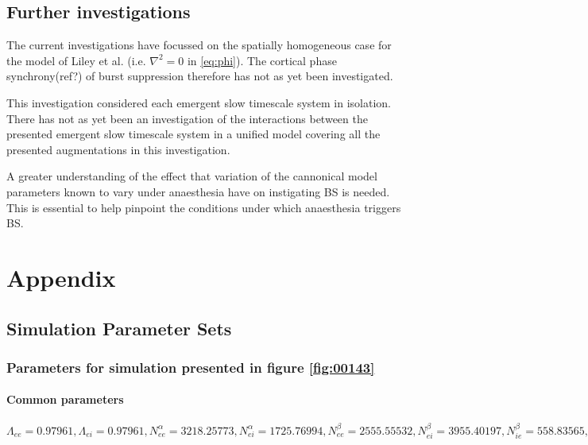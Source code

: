 \documentclass[a4paper,12pt]{article}
\begin{document}
\subsection{Further investigations}
The current investigations have focussed on the spatially homogeneous case for the model of Liley et al. (i.e. $\nabla^2 =
0$ in \ref{eq:phi}). The cortical phase synchrony(ref?) of burst suppression therefore has not as yet been investigated.

This investigation considered each emergent slow timescale system in isolation. There has not as yet been an investigation of the
interactions between the presented emergent slow timescale system in a unified model covering all the presented augmentations in this investigation.

A greater understanding of the effect that variation of the cannonical model parameters known to vary under anaesthesia have on instigating BS is needed. This is essential to help pinpoint the conditions under which anaesthesia triggers BS.

\appendix
\section{Appendix}
\subsection{Simulation Parameter Sets}
\subsubsection{Parameters for simulation presented in figure \ref{fig:00143}}
\paragraph{Common parameters}
$\Lambda_{ee} = 0.97961, \Lambda_{ei} = 0.97961, N^{\alpha}_{ee} = 3218.25773, N^{\alpha}_{ei} = 1725.76994,
N^{\beta}_{ee} = 2555.55532, N^{\beta}_{ei} = 3955.40197, N^{\beta}_{ie} = 558.83565, N^{\beta}_{ii} = 805.76418,
\Gamma_{ee} = 0.15173, \Gamma_{ei} = 0.27124, 
 g = 0.7, \gamma_{ee} = 0.31475, \gamma_{ei} = 0.24595,  h_e^{rest} = -66.96585, h_{ee}^{eq} = 0.03533, h_{ei}^{eq} = -6.84352,
h_i^{rest} = -77.90611, h_{ie}^{eq} = -85.52639, h_{ii}^{eq} = -85.43499,
\mu_e = -50.73253, \mu_i = -51.66220,  \hat{p}_{ee} = 2.16873, \hat{p}_{ei} = 2.43422, p_{ie} = 0.0, p_{ii} = 0.0, \phi_{ie} = 0,
\phi_{ii} = 0, S_e^{max} = 0.101903, S_i^{max} = 0.469, \sigma_e = 6.02439, \sigma_i = 4.21866,
\rho_e = 800.0, \rho_i = 3200.0, \tau_e = 139.779, \tau_i = 22.5263, \tau^{slow} = 6988.95,
v_{ee} = 0.68140, v_{ei} = 0.68140$
\end{document}
